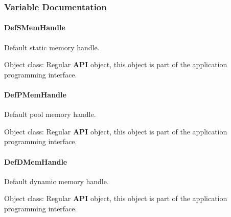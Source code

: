 \subsubsection{Variable Documentation}
\hypertarget{group__mem__intf_ga59214c7e13470c5e76c7b59c4f084b1c}{
\paragraph[{Def\-S\-Mem\-Handle}]{ Def\-S\-Mem\-Handle}}\label{group__mem__intf_ga59214c7e13470c5e76c7b59c4f084b1c}


Default static memory handle. 

\begin{DoxyParagraph}{Object class\-:}
Regular {\bfseries A\-P\-I} object, this object is part of the application programming interface. 
\end{DoxyParagraph}
\hypertarget{group__mem__intf_gafb0dc701e9679157a617a091843bcd7f}{
\paragraph[{Def\-P\-Mem\-Handle}]{ Def\-P\-Mem\-Handle}}\label{group__mem__intf_gafb0dc701e9679157a617a091843bcd7f}


Default pool memory handle. 

\begin{DoxyParagraph}{Object class\-:}
Regular {\bfseries A\-P\-I} object, this object is part of the application programming interface. 
\end{DoxyParagraph}
\hypertarget{group__mem__intf_gae2d3f8ca3b99ba0a5b9d9518a7bc280b}{
\paragraph[{Def\-D\-Mem\-Handle}]{ Def\-D\-Mem\-Handle}}\label{group__mem__intf_gae2d3f8ca3b99ba0a5b9d9518a7bc280b}


Default dynamic memory handle. 

\begin{DoxyParagraph}{Object class\-:}
Regular {\bfseries A\-P\-I} object, this object is part of the application programming interface. 
\end{DoxyParagraph}
